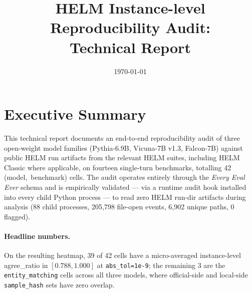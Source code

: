 \documentclass[11pt]{article}
\title{HELM Instance-level Reproducibility Audit: \\
       \large Technical Report}
\date{\today}
\newcommand{\eee}{\textit{Every Eval Ever}\xspace}
\begin{document}
\maketitle
\tableofcontents
\newpage


\section{Executive Summary}
\label{sec:tr-summary}

This technical report documents an end-to-end reproducibility audit of
  three open-weight model families
  (Pythia-6.9B, Vicuna-7B v1.3, Falcon-7B) against public HELM run
  artifacts from the relevant HELM suites, including HELM Classic
  where applicable, on fourteen single-turn benchmarks, totalling
  42 \mbox{(model, benchmark)} cells.
The audit operates entirely through the \eee{} schema and is
  empirically validated --- via a runtime audit hook installed into
  every child Python process --- to read zero HELM run-dir artifacts
  during analysis (88 child processes, 205{,}798 file-open events,
  6{,}902 unique paths, 0 flagged).

\paragraph{Headline numbers.}
On the resulting heatmap, 39 of 42 cells have a micro-averaged
  instance-level agree\_ratio in $[0.788, 1.000]$ at \texttt{abs\_tol=1e-9};
  the remaining 3 are the \texttt{entity\_matching} cells across all
  three models, where official-side and local-side \texttt{sample\_hash}
  sets have zero overlap.
\end{document}

